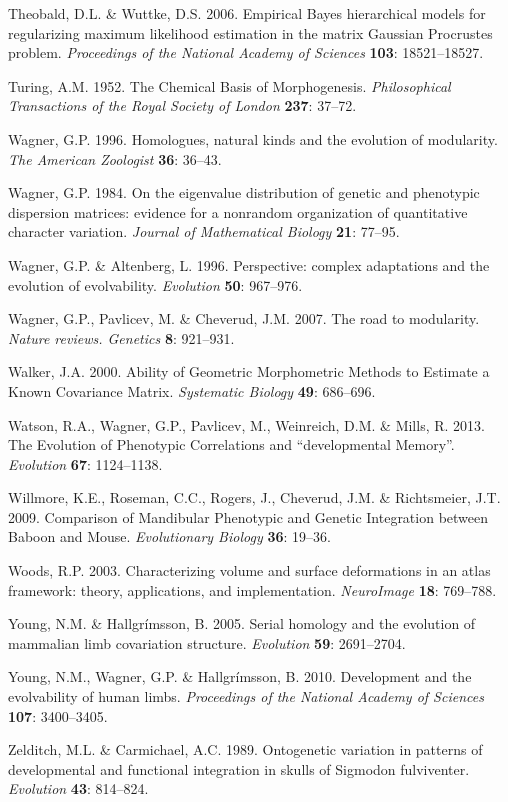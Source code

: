 \documentclass[12pt,]{article}
\begin{document}
Theobald, D.L. \& Wuttke, D.S. 2006. Empirical Bayes hierarchical models
for regularizing maximum likelihood estimation in the matrix Gaussian
Procrustes problem. \emph{Proceedings of the National Academy of
Sciences} \textbf{103}: 18521--18527.

Turing, A.M. 1952. The Chemical Basis of Morphogenesis.
\emph{Philosophical Transactions of the Royal Society of London}
\textbf{237}: 37--72.

Wagner, G.P. 1996. Homologues, natural kinds and the evolution of
modularity. \emph{The American Zoologist} \textbf{36}: 36--43.

Wagner, G.P. 1984. On the eigenvalue distribution of genetic and
phenotypic dispersion matrices: evidence for a nonrandom organization of
quantitative character variation. \emph{Journal of Mathematical Biology}
\textbf{21}: 77--95.

Wagner, G.P. \& Altenberg, L. 1996. Perspective: complex adaptations and
the evolution of evolvability. \emph{Evolution} \textbf{50}: 967--976.

Wagner, G.P., Pavlicev, M. \& Cheverud, J.M. 2007. The road to
modularity. \emph{Nature reviews. Genetics} \textbf{8}: 921--931.

Walker, J.A. 2000. Ability of Geometric Morphometric Methods to Estimate
a Known Covariance Matrix. \emph{Systematic Biology} \textbf{49}:
686--696.

Watson, R.A., Wagner, G.P., Pavlicev, M., Weinreich, D.M. \& Mills, R.
2013. The Evolution of Phenotypic Correlations and ``developmental
Memory''. \emph{Evolution} \textbf{67}: 1124--1138.

Willmore, K.E., Roseman, C.C., Rogers, J., Cheverud, J.M. \&
Richtsmeier, J.T. 2009. Comparison of Mandibular Phenotypic and Genetic
Integration between Baboon and Mouse. \emph{Evolutionary Biology}
\textbf{36}: 19--36.

Woods, R.P. 2003. Characterizing volume and surface deformations in an
atlas framework: theory, applications, and implementation.
\emph{NeuroImage} \textbf{18}: 769--788.

Young, N.M. \& Hallgrímsson, B. 2005. Serial homology and the evolution
of mammalian limb covariation structure. \emph{Evolution} \textbf{59}:
2691--2704.

Young, N.M., Wagner, G.P. \& Hallgrímsson, B. 2010. Development and the
evolvability of human limbs. \emph{Proceedings of the National Academy
of Sciences} \textbf{107}: 3400--3405.

Zelditch, M.L. \& Carmichael, A.C. 1989. Ontogenetic variation in
patterns of developmental and functional integration in skulls of
Sigmodon fulviventer. \emph{Evolution} \textbf{43}: 814--824.
\end{document}
